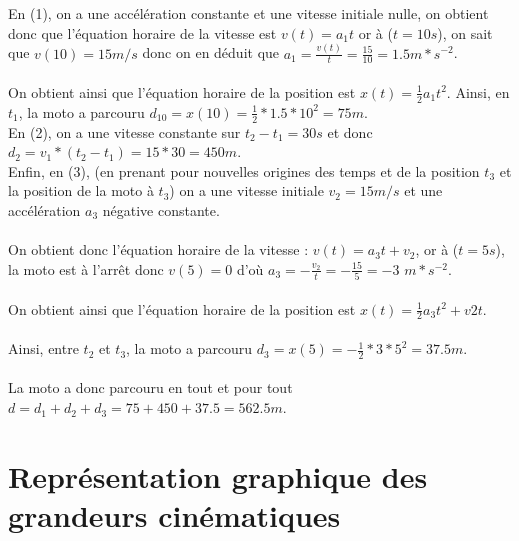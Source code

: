 \documentclass[a4paper,10pt]{book}
\begin{document}
En (1), on a une accélération constante et une vitesse initiale nulle, on obtient donc que l'équation horaire de la vitesse est $v(t)=a_{1}t$ or à ($t=10s$), on sait que $v(10)=15m/s$ donc on en déduit que $a_{1}=\frac{v(t)}{t}=\frac{15}{10}=1.5m*s^{-2}$.\\\\
On obtient ainsi que l'équation horaire de la position est $x(t)=\frac{1}{2}a_{1}t^{2}$. Ainsi, en $t_{1}$, la moto a parcouru $d_{10}=x(10)=\frac{1}{2}*1.5*10^{2}=75m$.\\

En (2), on a une vitesse constante sur $t_{2}-t_{1}=30s$ et donc $d_{2}=v_{1}*(t_{2}-t_{1})=15*30=450m$.\\

Enfin, en (3), (en prenant pour nouvelles origines des temps et de la position $t_{3}$ et la position de la moto à $t_{3}$) on a une vitesse initiale $v_{2}=15m/s$ et une accélération $a_{3}$ négative constante.\\\\
On obtient donc l'équation horaire de la vitesse : $v(t)=a_{3}t+v_{2}$, or à ($t=5s$), la moto est à l’arrêt donc $v(5)=0$ d'où $a_{3}=-\frac{v_{2}}{t}=-\frac{15}{5}=-3$ $m*s^{-2}$.\\\\
On obtient ainsi que l'équation horaire de la position est $x(t)=\frac{1}{2}a_{3}t^{2}+v{2}t$.\\\\ Ainsi, entre $t_{2}$ et $t_{3}$, la moto a parcouru $d_{3}=x(5)=-\frac{1}{2}*3*5^{2}=37.5m$.\\\\

La moto a donc parcouru en tout et pour tout $d=d_{1}+d_{2}+d_{3}=75+450+37.5=562.5m$.

\section{Représentation graphique des grandeurs cinématiques}
\end{document}
